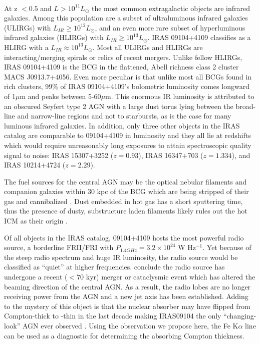 \documentclass[letterpaper,11pt,twocolumn]{article}
\begin{document}
\\
At z $< 0.5$ and $L > 10^{11} L_{\odot}$ the most common extragalactic
objects are infrared galaxies. Among this population are a subset of
ultraluminous infrared galaxies (ULIRGs) with $L_{IR} \geq 10^{12}
L_{\odot}$, and an even more rare subset of hyperluminous infrared
galaxies (HLIRGs) with $L_{IR} \geq 10^{13} L_{\odot}$. IRAS
09104+4109 classifies as a HLIRG with a $L_{IR} \approx 10^{13}
L_{\odot}$. Most all ULIRGs and HLIRGs are interacting/merging spirals
or relics of recent mergers. Unlike fellow HLIRGs, IRAS 09104+4109 is
the BCG in the flattened, Abell richness class 2 cluster MACS
J0913.7+4056. Even more peculiar is that unlike most all BCGs found in
rich clusters, 99\% of IRAS 09104+4109's bolometric luminosity comes
longward of 1$\mu$m and peaks between 5-60$\mu$m. This enormous IR
luminosity is attributed to an obscured Seyfert type 2 AGN with a
large dust torus lying between the broad-line and narrow-line regions
\citep{1999ApJ...512..145H} and not to starbursts, as is the case for
many luminous infrared galaxies. In addition, only three other objects
in the IRAS catalog are comparable to 09104+4109 in luminosity and
they all lie at redshifts which would require unreasonably long
exposures to attain spectroscopic quality signal to noise: IRAS
15307+3252 ($z=0.93$), IRAS 16347+703 ($z=1.334$), and IRAS 10214+4724
($z=2.29$).

The fuel sources for the central AGN may be the optical nebular
filaments and companion galaxies within 30 kpc of the BCG which are
being stripped of their gas and cannibalized
\citep{1999Ap&SS.266..113A}. Dust embedded in hot gas has a short
sputtering time, thus the presence of dusty, substructure laden
filaments likely rules out the hot ICM as their origin
\citep{1993ApJ...414L..17D, 2000AJ....120..562T}.

Of all objects in the IRAS catalog, 09104+4109 hosts the most powerful
radio source, a borderline FRII/FRI with $P_{1.4GHz} =
3.2\times10^{24}$ W Hz$^{-1}$. Yet because of the steep radio spectrum
and huge IR luminosity, the radio source would be classified as
``quiet'' at higher frequencies. \cite{1999ApJ...512..145H} conclude
the radio source has undergone a recent ($< 70$ kyr) merger or
cataclysmic event which has altered the beaming direction of the
central AGN. As a result, the radio lobes are no longer receiving
power from the AGN and a new jet axis has been established. Adding to
the mystery of this object is that the nuclear absorber may have
flipped from Compton-thick to -thin in the last decade making
IRAS09104 the only ``changing-look'' AGN ever observed
\citep{2007A&A...473...85P}. Using the observation we propose here,
the Fe K$\alpha$ line can be used as a diagnostic for determining the
absorbing Compton thickness.\\
\end{document}
